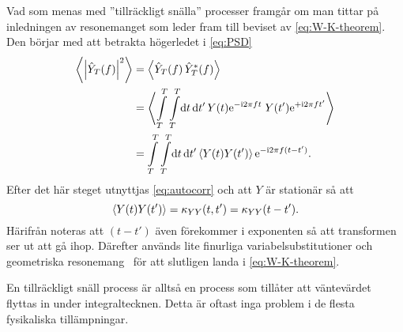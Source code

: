 Vad som menas med ''tillräckligt snälla'' processer framgår om man tittar på inledningen av resonemanget som leder fram till beviset av \eqref{eq:W-K-theorem}. Den börjar med att betrakta högerledet i \eqref{eq:PSD}~\cite{Miller_probability2012}
\begin{equation}
\begin{aligned}
\ev{\abs{\hat{Y}_T(f)}^2}&=\ev{\hat{Y}_T(f)\,\hat{Y}_T^*(f)}\\
&=\ev{
\int_T^T\int_T^T\!\dd{t}\dd{t'} Y(t)\ee^{-\ii 2\pi ft}
 \;Y(t')\ee^{+\ii 2\pi ft'}
}\\
&=\int_T^T\int_T^T\!\dd{t}\dd{t'} 
\ev{Y(t)Y(t')} \ee^{-\ii 2\pi f(t-t')}.
\end{aligned}
\end{equation}
Efter det här steget utnyttjas \eqref{eq:autocorr} och att $Y$ är stationär så att
\begin{equation}
\ev{Y(t)Y(t')} = \kappa_{YY}(t, t') = \kappa_{YY}(t-t').
\end{equation}
Härifrån noteras att $(t-t')$ även förekommer i exponenten så att transformen ser ut att gå ihop. Därefter används lite finurliga variabelsubstitutioner och geometriska resonemang~\cite{Miller_probability2012} för att slutligen landa i \eqref{eq:W-K-theorem}.

En tillräckligt snäll process är alltså en process som tillåter att väntevärdet flyttas in under integraltecknen. Detta är oftast inga problem i de flesta fysikaliska tillämpningar. 



